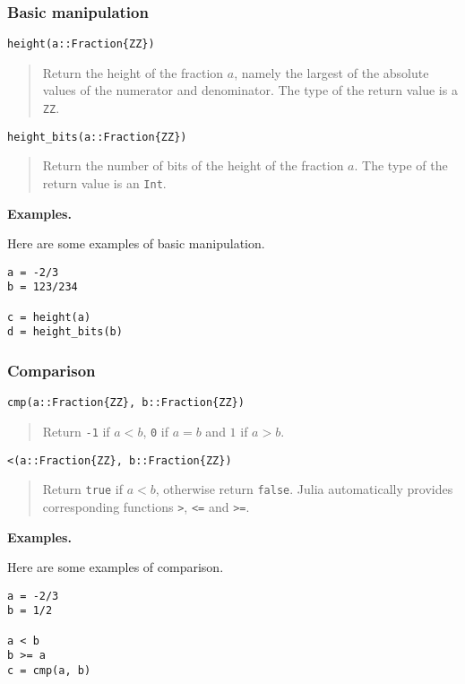 \documentclass[a4paper,10pt]{article}
\newcommand{\code}{\lstinline}
\newcommand{\desc}[1]{\vspace{-3mm}\begin{quote}#1\end{quote}}
\begin{document}
{{{\subsubsection{Basic manipulation}

\begin{lstlisting}
height(a::Fraction{ZZ})
\end{lstlisting}

\desc{Return the height of the fraction $a$, namely the largest of the absolute
values of the numerator and denominator. The type of the return value is a 
\code{ZZ}.}

\begin{lstlisting}
height_bits(a::Fraction{ZZ})
\end{lstlisting}

\desc{Return the number of bits of the height of the fraction $a$. The type of
the return value is an \code{Int}.}

\textbf{Examples.}

Here are some examples of basic manipulation.

\begin{lstlisting}
a = -2/3
b = 123/234

c = height(a)
d = height_bits(b)
\end{lstlisting}

\subsubsection{Comparison}

\begin{lstlisting}
cmp(a::Fraction{ZZ}, b::Fraction{ZZ}) 
\end{lstlisting}

\desc{Return \code{-1} if $a < b$, \code{0} if $a = b$ and $1$ if $a > b$.}

\begin{lstlisting}
<(a::Fraction{ZZ}, b::Fraction{ZZ}) 
\end{lstlisting}

\desc{Return \code{true} if $a < b$, otherwise return \code{false}. Julia
automatically provides corresponding functions \code{>}, \code{<=} and
\code{>=}.}

\textbf{Examples.}

Here are some examples of comparison.

\begin{lstlisting}
a = -2/3
b = 1/2

a < b
b >= a
c = cmp(a, b)
\end{lstlisting}

}}}
\end{document}
